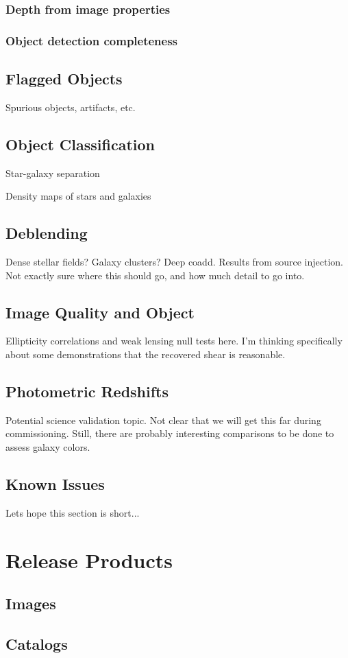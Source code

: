 \subsubsection{Depth from image properties}

\subsubsection{Object detection completeness}


\subsection{Flagged Objects}

Spurious objects, artifacts, etc.

\subsection{Object Classification}

Star-galaxy separation

Density maps of stars and galaxies

\subsection{Deblending}

Dense stellar fields? Galaxy clusters? Deep coadd. Results from source injection.
Not exactly sure where this should go, and how much detail to go into.

\subsection{Image Quality and Object }

Ellipticity correlations and weak lensing null tests here. 
I'm thinking specifically about some demonstrations that the recovered shear is reasonable.

\subsection{Photometric Redshifts}

Potential science validation topic. Not clear that we will get this far during commissioning. Still, there are probably interesting comparisons to be done to assess galaxy colors.

\subsection{Known Issues}

Lets hope this section is short...

\section{Release Products}

\subsection{Images}

\subsection{Catalogs}

